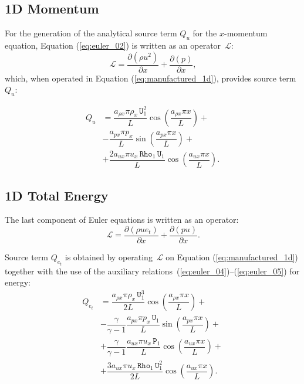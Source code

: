 \documentclass[10pt]{article}
\newcommand{\Diff}[2] {\dfrac{\partial( #1)}{\partial #2}}
\newcommand{\Rho}{\,\mathtt{Rho}}
\newcommand{\PP}{\,\mathtt{P}}
\newcommand{\U}{\,\mathtt{U}}
\newcommand{\Lo}{\,\mathcal{L}}
\begin{document}
\subsection{1D Momentum}

For the generation of the analytical source term $Q_u$ for the $x$-momentum equation, Equation  (\ref{eq:euler_02}) is written as an  operator $\Lo$:
\begin{equation*}
 \Lo=\Diff{\rho u^2 }{x}+ \Diff{p}{x},
\end{equation*}
which, when operated in Equation (\ref{eq:manufactured_1d}), provides source term $Q_{u}$:

\begin{equation}
 \begin{split}
Q_u&=\dfrac{a_{\rho x} \pi \rho_x \U_1^2}{L}\cos\left(\dfrac{a_{\rho x} \pi x}{L}\right) +\\
&-\dfrac{ a_{px} \pi p_x}{L}\sin\left(\dfrac{a_{px} \pi x}{L}\right) +\\
&+  \dfrac{2a_{ux} \pi u_x \Rho_1 \U_1}{L}\cos\left(\dfrac{a_{ux} \pi x}{L}\right).
 \end{split}
\end{equation}



\subsection{1D Total Energy}


The last component of Euler equations is written as an operator:
\begin{equation*}
 \Lo= \Diff{\rho ue_t }{x}+\Diff{pu}{x} .
\end{equation*}


Source term $Q_{e_t}$ is obtained by operating $\Lo$ on Equation  (\ref{eq:manufactured_1d}) together with the use of the  auxiliary relations~(\ref{eq:euler_04})--(\ref{eq:euler_05}) for energy:
  \begin{equation}\label{eq:source_e}
 \begin{split}
Q_{e_t} &= \dfrac{a_{\rho x} \pi \rho_x \U_1^3 }{2L}\cos\left(\dfrac{a_{\rho x} \pi x}{L}\right)+\\
&- \dfrac{\gamma}{\gamma-1}\dfrac{a_{px} \pi p_x \U_1}{L}\sin\left(\dfrac{a_{px} \pi x}{L}\right) +\\
&+ \dfrac{\gamma}{\gamma-1}\dfrac{a_{ux} \pi u_x \PP_1}{L}\cos\left(\dfrac{a_{ux} \pi x}{L}\right)  +\\
&+ \dfrac{ 3 a_{ux} \pi u_x \Rho_1 \U_1^2 }{2L}\cos\left(\dfrac{a_{ux} \pi x}{L}\right).
 \end{split}
\end{equation}
\end{document}
